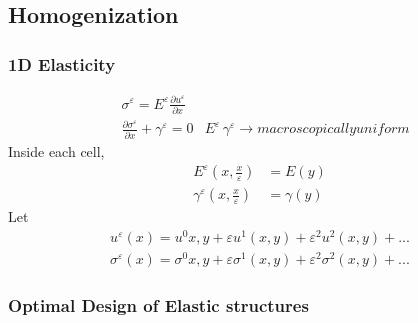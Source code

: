 \documentclass[10pt]{article}
\begin{document}
\subsection{Homogenization}
\subsubsection{1D Elasticity}
\begin{eqnarray}
&\sigma^\varepsilon = E^\varepsilon\frac{\partial u^\varepsilon}{\partial x}\\
&\frac{\partial \sigma^\varepsilon}{\partial x}+\gamma^\varepsilon=0 & E^\varepsilon \, \gamma^\varepsilon \rightarrow macroscopically uniform
\end{eqnarray}
Inside each cell, 
\begin{eqnarray}
E^\varepsilon (x, \frac{x}{\varepsilon})&=E(y) \\ 
\gamma^\varepsilon(x, \frac{x}{\varepsilon})&=\gamma(y)
\end{eqnarray} 
Let
\begin{eqnarray}
u^\varepsilon(x)=u^0{x,y}+\varepsilon u^1(x,y)+\varepsilon^2 u^2(x,y)+ ...\\
\sigma^\varepsilon(x)=\sigma^0{x,y}+\varepsilon \sigma^1(x,y)+\varepsilon^2 \sigma^2(x,y)+ ...
\end{eqnarray}


\subsubsection{Optimal Design of Elastic structures}
\end{document}
